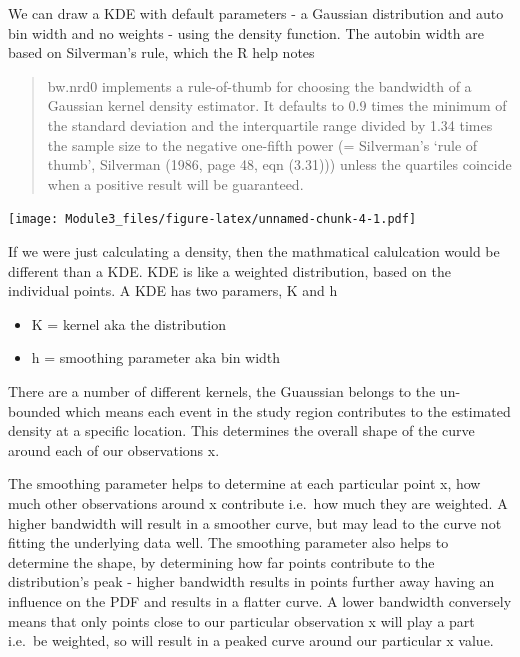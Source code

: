 \documentclass[]{book}
\newenvironment{Shaded}{\begin{snugshade}}{\end{snugshade}}
\newcommand{\KeywordTok}[1]{\textcolor[rgb]{0.13,0.29,0.53}{\textbf{#1}}}
\newcommand{\StringTok}[1]{\textcolor[rgb]{0.31,0.60,0.02}{#1}}
\newcommand{\OperatorTok}[1]{\textcolor[rgb]{0.81,0.36,0.00}{\textbf{#1}}}
\newcommand{\NormalTok}[1]{#1}
\providecommand{\tightlist}{%
  \setlength{\itemsep}{0pt}\setlength{\parskip}{0pt}}
\theoremstyle{definition}
\theoremstyle{definition}
\theoremstyle{definition}
\theoremstyle{remark}
\begin{document}
We can draw a KDE with default parameters - a Gaussian distribution and
auto bin width and no weights - using the density function. The autobin
width are based on Silverman's rule, which the R help notes

\begin{quote}
bw.nrd0 implements a rule-of-thumb for choosing the bandwidth of a
Gaussian kernel density estimator. It defaults to 0.9 times the minimum
of the standard deviation and the interquartile range divided by 1.34
times the sample size to the negative one-fifth power (= Silverman's
`rule of thumb', Silverman (1986, page 48, eqn (3.31))) unless the
quartiles coincide when a positive result will be guaranteed.
\end{quote}

\begin{Shaded}
\end{Shaded}

\texttt{[image: Module3\_files/figure-latex/unnamed-chunk-4-1.pdf]}

If we were just calculating a density, then the mathmatical calulcation
would be different than a KDE. KDE is like a weighted distribution,
based on the individual points. A KDE has two paramers, K and h

\begin{itemize}
\tightlist
\item
  K = kernel aka the distribution
\item
  h = smoothing parameter aka bin width
\end{itemize}

There are a number of different kernels, the Guaussian belongs to the
un-bounded which means each event in the study region contributes to the
estimated density at a specific location. This determines the overall
shape of the curve around each of our observations x.

The smoothing parameter helps to determine at each particular point x,
how much other observations around x contribute i.e.~how much they are
weighted. A higher bandwidth will result in a smoother curve, but may
lead to the curve not fitting the underlying data well. The smoothing
parameter also helps to determine the shape, by determining how far
points contribute to the distribution's peak - higher bandwidth results
in points further away having an influence on the PDF and results in a
flatter curve. A lower bandwidth conversely means that only points close
to our particular observation x will play a part i.e.~be weighted, so
will result in a peaked curve around our particular x value.
\end{document}

